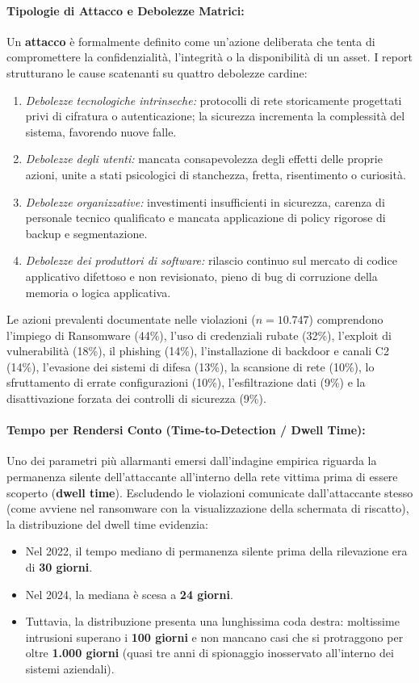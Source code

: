 \documentclass[../../main.tex]{subfiles}
\begin{document}
\paragraph{Tipologie di Attacco e Debolezze Matrici:}
Un \textbf{attacco} è formalmente definito come un'azione deliberata che tenta di compromettere la confidenzialità, l'integrità o la disponibilità di un asset. I report strutturano le cause scatenanti su quattro debolezze cardine:
\begin{enumerate}
    \item \textit{Debolezze tecnologiche intrinseche:} protocolli di rete storicamente progettati privi di cifratura o autenticazione; la sicurezza incrementa la complessità del sistema, favorendo nuove falle.
    \item \textit{Debolezze degli utenti:} mancata consapevolezza degli effetti delle proprie azioni, unite a stati psicologici di stanchezza, fretta, risentimento o curiosità.
    \item \textit{Debolezze organizzative:} investimenti insufficienti in sicurezza, carenza di personale tecnico qualificato e mancata applicazione di policy rigorose di backup e segmentazione.
    \item \textit{Debolezze dei produttori di software:} rilascio continuo sul mercato di codice applicativo difettoso e non revisionato, pieno di bug di corruzione della memoria o logica applicativa.
\end{enumerate}

Le azioni prevalenti documentate nelle violazioni ($n=10.747$) comprendono l'impiego di Ransomware (44\%), l'uso di credenziali rubate (32\%), l'exploit di vulnerabilità (18\%), il phishing (14\%), l'installazione di backdoor e canali C2 (14\%), l'evasione dei sistemi di difesa (13\%), la scansione di rete (10\%), lo sfruttamento di errate configurazioni (10\%), l'esfiltrazione dati (9\%) e la disattivazione forzata dei controlli di sicurezza (9\%).

\paragraph{Tempo per Rendersi Conto (Time-to-Detection / Dwell Time):}
Uno dei parametri più allarmanti emersi dall'indagine empirica riguarda la permanenza silente dell'attaccante all'interno della rete vittima prima di essere scoperto (\textbf{dwell time}). Escludendo le violazioni comunicate dall'attaccante stesso (come avviene nel ransomware con la visualizzazione della schermata di riscatto), la distribuzione del dwell time evidenzia:
\begin{itemize}
    \item Nel 2022, il tempo mediano di permanenza silente prima della rilevazione era di \textbf{30 giorni}.
    \item Nel 2024, la mediana è scesa a \textbf{24 giorni}.
    \item Tuttavia, la distribuzione presenta una lunghissima coda destra: moltissime intrusioni superano i \textbf{100 giorni} e non mancano casi che si protraggono per oltre \textbf{1.000 giorni} (quasi tre anni di spionaggio inosservato all'interno dei sistemi aziendali).
\end{itemize}
\end{document}
